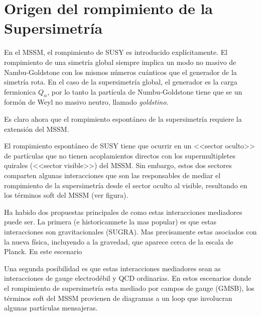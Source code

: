 


\section{Origen del rompimiento de la Supersimetría}

En el MSSM, el rompimiento de SUSY es introducido explícitamente.
El rompimiento de una simetría global siempre implica un modo
no masivo de Nambu-Goldstone con los mismos números cuánticos que
el generador de la simetría rota. En el caso de la supersimetría
global, el generador es la carga fermionica $Q_\alpha$, por lo
tanto la partícula de Numbu-Goldstone tiene que se un formón
de Weyl no masivo neutro, llamado \emph{goldstino}.

Es claro ahora que el rompimiento espontáneo de la supersimetría
requiere la extensión del MSSM.

El rompimiento espontáneo de SUSY tiene que ocurrir en un
<<sector oculto>>  de partículas que no tienen acoplamientos
directos con los supermultipletes quirales (<<sector visible>>)
del MSSM. Sin embargo, estos dos sectores comparten algunas
interacciones que son las responsables de mediar el rompimiento
de la supersimetría desde el sector oculto al visible, resultando
en los términos soft del MSSM (ver figura).

\begin{figure}[h]
  \centering
  
\end{figure}

Ha habido dos propuestas principales de como estas interacciones
mediadores puede ser. La primera (e historicamnete la mas popular)
es que estas interacciones son gravitacionales (SUGRA). Mas precisamente
estas asociados con la nueva física, incluyendo a la gravedad, que
aparece cerca de la escala de Planck. En este escenario

Una segunda posibilidad es que estas interacciones mediadores sean
as interacciones de gauge electrodébil y QCD ordinarias. En estos
escenarios donde el rompimiento de supersimetría esta mediado por
campos de gauge (GMSB), los términos soft del MSSM provienen de
diagramas a un loop que involucran algunas partículas mensajeras.


